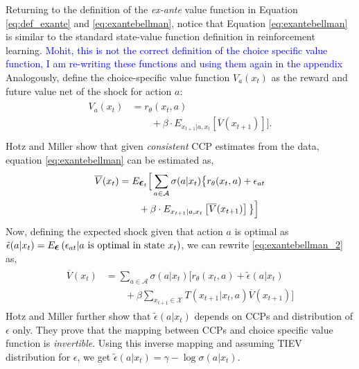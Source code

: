 \documentclass{article}
\renewcommand{\vec}[1]{\mbox{\bm{$#1$}}}
\begin{document}
Returning to the definition of the \emph{ex-ante} value function in Equation \eqref{eq:def_exante} and \eqref{eq:exantebellman}, notice that Equation \eqref{eq:exantebellman} is similar to the standard state-value function definition in reinforcement learning. \textcolor{blue}{Mohit, this is not the correct definition of the choice specific value function, I am re-writing these functions and using them again in the appendix} 
Analogously, define the choice-specific value function $V_a(x_t)$ as the reward and future value net of the shock for action $a$:
\begin{align}
\begin{split}
V_a(x_t) &= r_{\theta}(x_t,a) \\
& \qquad +\beta  \cdot E_{x_{t+1}|a,x_t} \left[ \overline{V}(x_{t+1}) \right] \Big].\\
\end{split}
\end{align}
Hotz and Miller  show that given \textit{consistent} CCP estimates from the data, equation \eqref{eq:exantebellman} can be estimated as,
\begin{align} \label{eq:exantebellman_2}
\begin{split}
\overline{V}(x_t) & = E_{\vec{\epsilon}_t}\Big[\sum_{a\in\mathcal{A}} \sigma(a|x_t) \big\{r_{\theta}(x_t,a)+\epsilon_{at} \\
& \qquad +\beta  \cdot E_{x_{t+1}|a,x_t} \left[ \overline{V}(x_{t+1}) \right] \big\}\Big]\\
\end{split}
\end{align}
Now, defining the expected shock given that action $a$ is optimal as $\tilde{\epsilon}(a|x_t) = E_{\vec{\epsilon}}\left( \epsilon_{at} |a\ \textrm{is optimal in state } x_t\right)$, we can rewrite \eqref{eq:exantebellman_2} as,
\begin{align} \label{eq:exantebellman_3}
\begin{split}
\overline{V}(x_t) & = \sum_{a\in\mathcal{A}} \sigma(a|x_t) \Big[r_{\theta}(x_t,a)+\tilde{\epsilon}(a|x_t) \\
& \qquad +\beta \sum_{x_{t+1}\in\mathcal{X}} T(x_{t+1}|x_t,a) \overline{V}(x_{t+1})\Big]
\end{split}
\end{align}
Hotz and Miller  further show that $\tilde{\epsilon}(a|x_t)$ depends on CCPs and distribution of $\epsilon$ only. They prove that the mapping between CCPs and choice specific value function is \emph{invertible}. Using this inverse mapping and assuming TIEV distribution for $\epsilon$, we get $\tilde{\epsilon}(a|x_t) = \gamma - \log \sigma(a|x_t)$.
\end{document}
